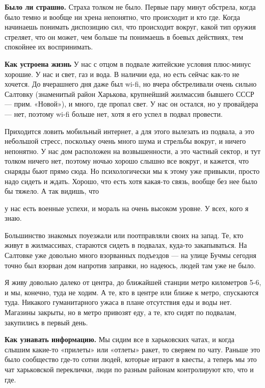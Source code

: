 \textbf{Было ли страшно.}
Страха толком не было. Первые пару минут обстрела, когда было темно и вообще ни хрена непонятно, что происходит и кто где. Когда начинаешь понимать диспозицию сил, что происходит вокруг, какой тип оружия стреляет, что он может, чем больше ты понимаешь в боевых действиях, тем спокойнее их воспринимать.

\textbf{Как устроена жизнь}
У нас с отцом в подвале житейские условия плюс-минус хорошие. У нас и свет, газ и вода. В наличии еда, но есть сейчас как-то не хочется. До вчерашнего дня даже был wi-fi, но вчера обстреливали очень сильно Салтовку (знаменитый район Харькова, крупнейший жилмассив бывшего СССР — прим. «Новой»), и много, где пропал свет. У нас он остался, но у провайдера — нет, поэтому wi-fi больше нет, хотя я его успел в подвал провести.

Приходится ловить мобильный интернет, а для этого вылезать из подвала, а это небольшой стресс, поскольку очень много шума и стрельбы вокруг, и ничего непонятно. У нас дом расположен на возвышенности, а это частный сектор, и тут толком ничего нет, поэтому ночью хорошо слышно все вокруг, и кажется, что снаряды бьют прямо сюда. Но психологически мы к этому уже привыкли, просто надо сидеть и ждать. Хорошо, что есть хотя какая-то связь, вообще без нее было бы тяжело. А так видишь, что

\begin{fancyquotes}
    у нас есть военные успехи, и мораль на очень высоком уровне. У всех, кого я знаю.
\end{fancyquotes}

Большинство знакомых поуезжали или поотправляли своих на запад. Те, кто живут в жилмассивах, стараются сидеть в подвалах, куда-то закапываться. На Салтовке уже довольно много взорванных подъездов — на улице Бучмы сегодня точно был взорван дом напротив заправки, но надеюсь, людей там уже не было.

Я живу довольно далеко от центра, до ближайшей станции метро километров 5-6, и мы, конечно, туда не ходим. А те, кто в центре или ближе к метро, спускаются туда. Никакого гуманитарного ужаса в плане отсутствия еды и воды нет. Магазины закрыты, но в метро привозят еду, а те, кто сидят по подвалам, закупились в первый день.

\textbf{Как узнавать информацию.}
Мы сидим все в харьковских чатах, и когда слышим какие-то «прилеты» или «отлеты» ракет, то сверяем по чату. Раньше это было сообщество где-то сотни людей, которые играют в квесты, а теперь мы это чат харьковской переклички, люди по разным районам контролируют кто, что и где.

